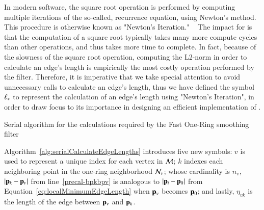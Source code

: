 In modern software, the square root operation is performed by computing multiple iterations of the so-called, recurrence equation, using Newton's method. This procedure is otherwise known as "Newton's Iteration." ~\cite{Weisstein19b} The impact for  is that the computation of a square root typically takes many more compute cycles than other operations, and thus takes more time to complete. In fact, because of the slowness of the square root operation, computing the L2-norm in order to calculate an edge's length is empirically the most costly operation performed by the filter. Therefore, it is imperative that we take special attention to avoid unnecessary calls to calculate an edge's length, thus we have defined the symbol $\ell_\ast$ to represent the calculation of an edge's length using "Newton's Iteration", in order to draw focus to its importance  in designing an efficient implementation of .%

%
%
\begin{algorithm}
	\DontPrintSemicolon


	\bigskip
	\;
\nl	{}
	\caption{Serial algorithm for the calculations required by the Fast One-Ring smoothing filter\label{alg:serialCalculateEdgeLengths}}
\end{algorithm}

Algorithm~\ref{alg:serialCalculateEdgeLengths} introduces five new symbols: $v$ is used to represent a unique index for each vertex in $\mathcal{M}$; $k$ indexes each neighboring point in the one-ring neighborhood $\mathcal{N}_v$; whose cardinality is $n_v$, $|\mathbf{p}_k-\mathbf{p}_v|$ from line~\ref{precal-bpkbpv} is analogous to $|\mathbf{p}_i-\mathbf{p}_0|$ from Equation~\ref{eq:localMinimumEdgeLength} when $\mathbf{p}_v$ becomes $\mathbf{p}_0$; and lastly, $\eta_{vk}$ is the length of the edge between $\mathbf{p}_v$ and $\mathbf{p}_k$.%
%
